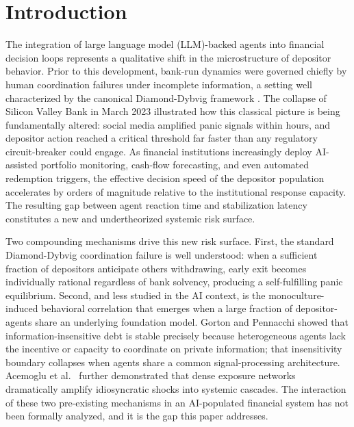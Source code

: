 \section{Introduction}
\label{sec:intro}

The integration of large language model (LLM)-backed agents into financial decision loops represents a qualitative shift in the microstructure of depositor behavior. Prior to this development, bank-run dynamics were governed chiefly by human coordination failures under incomplete information, a setting well characterized by the canonical Diamond-Dybvig framework \citep{diamond1983bank}. The collapse of Silicon Valley Bank in March 2023 illustrated how this classical picture is being fundamentally altered: social media amplified panic signals within hours, and depositor action reached a critical threshold far faster than any regulatory circuit-breaker could engage. As financial institutions increasingly deploy AI-assisted portfolio monitoring, cash-flow forecasting, and even automated redemption triggers, the effective decision speed of the depositor population accelerates by orders of magnitude relative to the institutional response capacity. The resulting gap between agent reaction time and stabilization latency constitutes a new and undertheorized systemic risk surface.

Two compounding mechanisms drive this new risk surface. First, the standard Diamond-Dybvig coordination failure is well understood: when a sufficient fraction of depositors anticipate others withdrawing, early exit becomes individually rational regardless of bank solvency, producing a self-fulfilling panic equilibrium. Second, and less studied in the AI context, is the monoculture-induced behavioral correlation that emerges when a large fraction of depositor-agents share an underlying foundation model. Gorton and Pennacchi \citep{gorton1990financial} showed that information-insensitive debt is stable precisely because heterogeneous agents lack the incentive or capacity to coordinate on private information; that insensitivity boundary collapses when agents share a common signal-processing architecture. Acemoglu et al.\ \citep{acemoglu2015systemic} further demonstrated that dense exposure networks dramatically amplify idiosyncratic shocks into systemic cascades. The interaction of these two pre-existing mechanisms in an AI-populated financial system has not been formally analyzed, and it is the gap this paper addresses.

